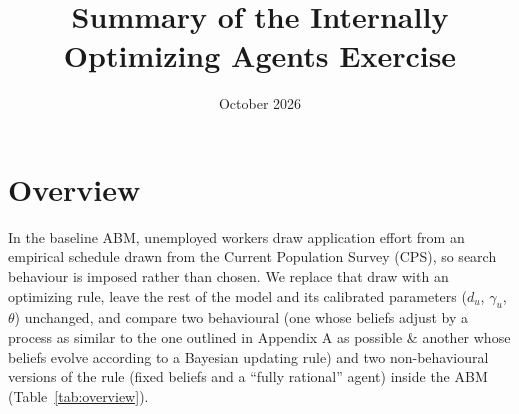 \documentclass[11pt]{article}
\title{Summary of the Internally Optimizing Agents Exercise}
\date{October 2026}
\begin{document}
\maketitle

\section{Overview}

In the baseline ABM, unemployed
workers draw application effort from an empirical schedule drawn from the Current Population Survey (CPS), so search behaviour is imposed rather than chosen. We
replace that draw with an optimizing rule, leave the rest of the model and its calibrated parameters ($d_u$,
$\gamma_u$, $\theta$) unchanged, and compare two behavioural (one whose beliefs adjust by a process as similar to the one outlined in Appendix A as possible \& another whose beliefs evolve according to a Bayesian updating rule) and two non-behavioural versions of the rule (fixed beliefs and a ``fully rational'' agent) inside the
ABM (Table~\ref{tab:overview}).
\end{document}
